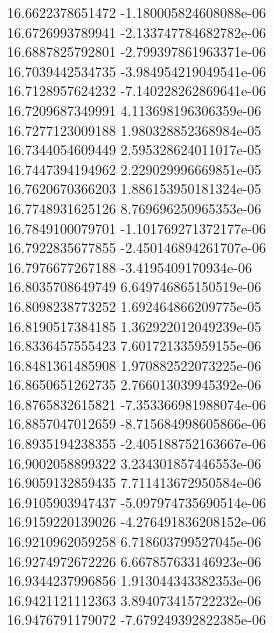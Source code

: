 {16.6622378651472 -1.180005824608088e-06
 \\
16.6726993789941 -2.133747784682782e-06
 \\
16.6887825792801 -2.799397861963371e-06
 \\
16.7039442534735 -3.984954219049541e-06
 \\
16.7128957624232 -7.140228262869641e-06
 \\
16.7209687349991 4.113698196306359e-06
 \\
16.7277123009188 1.980328852368984e-05
 \\
16.7344054609449 2.595328624011017e-05
 \\
16.7447394194962 2.229029996669851e-05
 \\
16.7620670366203 1.886153950181324e-05
 \\
16.7748931625126 8.769696250965353e-06
 \\
16.7849100079701 -1.101769271372177e-06
 \\
16.7922835677855 -2.450146894261707e-06
 \\
16.7976677267188 -3.4195409170934e-06
 \\
16.8035708649749 6.649746865150519e-06
 \\
16.8098238773252 1.692464866209775e-05
 \\
16.8190517384185 1.362922012049239e-05
 \\
16.8336457555423 7.601721335959155e-06
 \\
16.8481361485908 1.970882522073225e-06
 \\
16.8650651262735 2.766013039945392e-06
 \\
16.8765832615821 -7.353366981988074e-06
 \\
16.8857047012659 -8.715684998605866e-06
 \\
16.8935194238355 -2.405188752163667e-06
 \\
16.9002058899322 3.234301857446553e-06
 \\
16.9059132859435 7.711413672950584e-06
 \\
16.9105903947437 -5.097974735690514e-06
 \\
16.9159220139026 -4.276491836208152e-06
 \\
16.9210962059258 6.718603799527045e-06
 \\
16.9274972672226 6.667857633146923e-06
 \\
16.9344237996856 1.913044343382353e-06
 \\
16.9421121112363 3.894073415722232e-06
 \\
16.9476791179072 -7.679249392822385e-06
}
